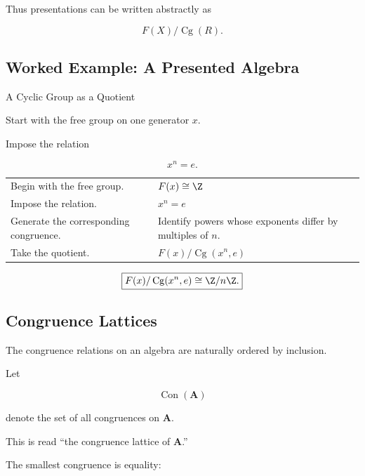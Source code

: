 Thus presentations can be written abstractly as

\[ F(X)/\operatorname{Cg}(R). \]

\subsection{Worked Example: A Presented Algebra}
\label{subsec:worked-presented-algebra}

\begin{workedexamplebox}{A Cyclic Group as a Quotient}

Start with the free group on one generator \(x\).

Impose the relation

\[ x^n=e. \]

\begin{tabularx}{\textwidth}{@{}>{\raggedright\arraybackslash}p{}X@{}}
Begin with the free group. & \(F(x)\cong\Z\)\\
Impose the relation. & \(x^n=e\)\\
Generate the corresponding congruence. &
Identify powers whose exponents differ by multiples of \(n\).\\
Take the quotient. & \(F(x)/\operatorname{Cg}(x^n,e)\)
\end{tabularx}

\begin{answerbox}
\[ \boxed{F(x)/\operatorname{Cg}(x^n,e)\cong\Z/n\Z.} \]
\end{answerbox}
\end{workedexamplebox}

\subsection{Congruence Lattices}
\label{subsec:congruence-lattices}

The congruence relations on an algebra are naturally ordered by inclusion.

Let

\[ \operatorname{Con}(\mathbf A) \]

denote the set of all congruences on \(\mathbf A\).

This is read ``the congruence lattice of \(\mathbf A\).''

The smallest congruence is equality:

